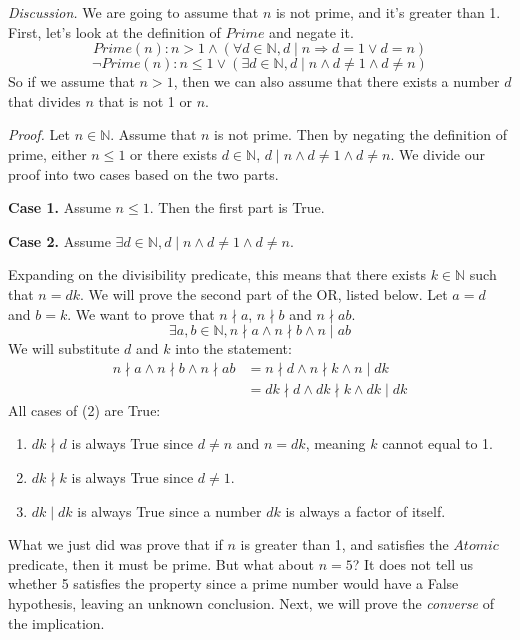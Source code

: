 \documentclass{article}
\begin{document}
\newpage
\textit{Discussion.} We are going to assume that $n$ is not prime, and it's
greater than 1. First, let's look at the definition of $Prime$ and negate it. 
$$Prime(n) : n > 1 \land (\forall d \in \mathbb{N}, d \mid n \Rightarrow 
d = 1 \lor d = n)$$
$$\neg Prime(n) : n \leq 1 \lor (\exists d \in \mathbb{N}, d \mid n \land d 
\neq 1 \land d \neq n)$$
So if we assume that $n > 1$, then we can also assume that there exists 
a number $d$ that divides $n$ that is not 1 or $n$.

\textit{Proof.} Let $n \in \mathbb{N}$. Assume that $n$ is not prime. Then 
by negating the definition of prime, either $n \leq 1$ or there exists 
$d \in \mathbb{N}$, $d \mid n \land d \neq 1 \land d \neq n$. We divide 
our proof into two cases based on the two parts.

\textbf{Case 1.} Assume $n \leq 1$. Then the first part is True. 

\textbf{Case 2.} Assume $\exists d \in \mathbb{N}, d \mid n \land d 
\neq 1 \land d \neq n$.

Expanding on the divisibility predicate, this means that there exists \linebreak 
$k \in \mathbb{N}$ such that $n = dk$. We will prove the second part of the 
OR, listed below. Let $a = d$ and $b = k$. We want to prove that $n \nmid a$, $n\nmid b$ 
and $n \nmid ab.$ 
$$\exists a, b \in \mathbb{N}, n \nmid a \land n \nmid b \land n \mid ab$$
We will substitute $d$ and $k$ into the statement:
\begin{align}
    n \nmid a\land n \nmid b \land n \nmid ab &= n \nmid d \land n \nmid k 
    \land n \mid dk \\
                                             &= dk \nmid d \land dk \nmid k
                                             \land dk \mid dk
\end{align}
All cases of (2) are True: 
\begin{enumerate}
    \item $dk \nmid d$ is always True since $d \neq n$ and $n = dk$, meaning 
        $k$ cannot equal to 1. 
    \item $dk \nmid k$ is always True since $d \neq 1$.
    \item $dk \mid dk$ is always True since a number $dk$ is always a factor 
        of itself. 
\end{enumerate}
What we just did was prove that if $n$ is greater than 1, and satisfies 
the $Atomic$ predicate, then it must be prime. But what about $n = 5$? It 
does not tell us whether 5 satisfies the property since a prime number would 
have a False hypothesis, leaving an unknown conclusion. Next, we will prove the \textit{converse} of the implication.
\end{document}
